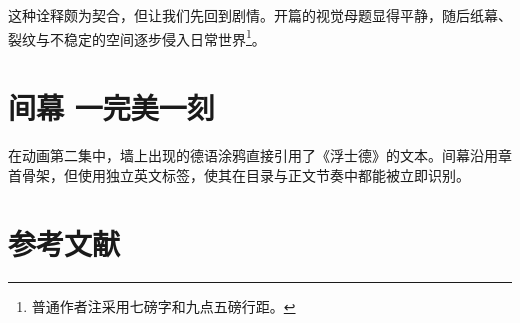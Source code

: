 \documentclass[fontset=none,openany,10pt,twoside]{ctexbook}
\begin{document}
这种诠释颇为契合，但让我们先回到剧情。开篇的视觉母题显得平静，随后纸幕、裂纹与不稳定的空间逐步侵入日常世界\footnote{普通作者注采用七磅字和九点五磅行距。}。
\clearpage

\renewcommand{\BookSpecialKicker}{INTERLUDE I}
\chapter*{间幕 一\quad 完美一刻}
\renewcommand{\BookSpecialKicker}{}
在动画第二集中，墙上出现的德语涂鸦直接引用了《浮士德》的文本。间幕沿用章首骨架，但使用独立英文标签，使其在目录与正文节奏中都能被立即识别。
\clearpage

\thispagestyle{bookbody}
\chapter*{参考文献}
\nocite{aristotle2009poetics,magicaquartet2011production-note}
\printbibliography[heading=none]
\end{document}
